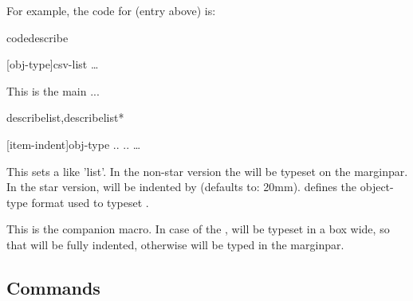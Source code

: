\documentclass{article}
\begin{document}
For example, the code for   (entry above) is:

\begin{codestore}[demoD]
\begin{codedescribe}[env,new=2023/05/01,update=2023/05/1,note={this is an example}]{codedescribe}
  \begin{codesyntax}
    \tsmacro{\begin{codedescribe}}[obj-type]{csv-list}
    \ldots
    \tsmacro{\end{codedescribe}}{}
  \end{codesyntax}
  This is the main ...
\end{codedescribe}
\end{codestore}  




\begin{codedescribe}[env]{describelist,describelist*}
  \begin{codesyntax}
\tsmacro{\begin{describelist}}[item-indent]{obj-type}
..
..
\ldots
\tsmacro{\end{describelist}}{}
  \end{codesyntax}
This sets a  like 'list'. In the non-star version the  will be typeset on the marginpar. In the star version,  will be indented by  (defaults to: 20mm).
 defines the object-type format used to typeset . 
\end{codedescribe}

\begin{codedescribe}[code]{\describe}
\begin{codesyntax}
\end{codesyntax}
This is the  companion macro. In case of the ,  will be typeset in a box  wide, so that  will be fully indented, otherwise  will be typed in the marginpar.
\end{codedescribe}


\subsection{Commands}
\end{document}
